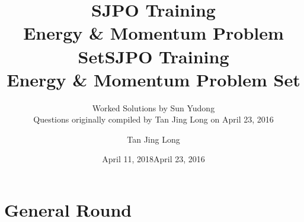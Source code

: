 \documentclass[answers]{exam}
\begin{document}
\ifprintanswers
	\title{\vspace{-1cm} SJPO Training\\ Energy \& Momentum Problem Set}
	\author{Worked Solutions by Sun Yudong \\ {\small Questions originally compiled by Tan Jing Long on April 23, 2016}}
	\date{April 11, 2018}
\else
	\title{SJPO Training\\ Energy \& Momentum Problem Set}
	\author{Tan Jing Long}
	\date{April 23, 2016}
\fi
\maketitle

\section{General Round}
\end{document}
